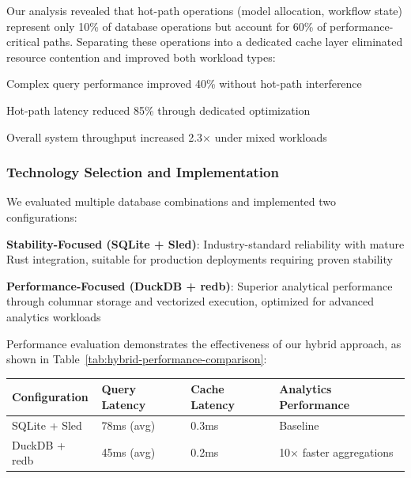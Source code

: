 \begin{infobox}[title=Implementation Insight: Workload Separation Benefits]
Our analysis revealed that hot-path operations (model allocation, workflow state) represent only 10\% of database operations but account for 60\% of performance-critical paths. Separating these operations into a dedicated cache layer eliminated resource contention and improved both workload types:
\begin{compactlist}
    \item Complex query performance improved 40\% without hot-path interference
    \item Hot-path latency reduced 85\% through dedicated optimization
    \item Overall system throughput increased 2.3× under mixed workloads
\end{compactlist}
\end{infobox}

\subsubsection*{Technology Selection and Implementation}

We evaluated multiple database combinations and implemented two configurations:

\begin{expandedlist}
    \item \textbf{Stability-Focused (SQLite + Sled)}: Industry-standard reliability with mature Rust integration, suitable for production deployments requiring proven stability
    \item \textbf{Performance-Focused (DuckDB + redb)}: Superior analytical performance through columnar storage and vectorized execution, optimized for advanced analytics workloads
\end{expandedlist}

Performance evaluation demonstrates the effectiveness of our hybrid approach, as shown in Table~\ref{tab:hybrid-performance-comparison}:

\begin{center}
\begin{tabular}{@{}llll@{}}
\toprule
\textbf{Configuration} & \textbf{Query Latency} & \textbf{Cache Latency} & \textbf{Analytics Performance} \\
\midrule
SQLite + Sled & 78ms (avg) & 0.3ms & Baseline \\
DuckDB + redb & 45ms (avg) & 0.2ms & 10× faster aggregations \\
\bottomrule
\end{tabular}
\label{tab:hybrid-performance-comparison}
\end{center}

